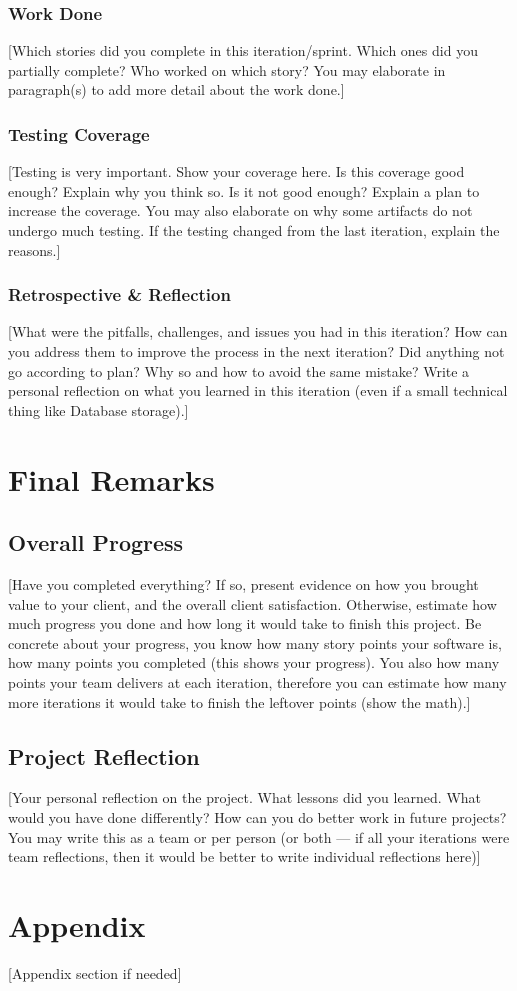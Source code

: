\documentclass{article}
\begin{document}
\subsubsection{Work Done}
[Which stories did you complete in this iteration/sprint. Which ones did you partially complete? Who worked on which story? You may elaborate in paragraph(s) to add more detail about the work done.]

\subsubsection{Testing Coverage}
[Testing is very important. Show your coverage here. Is this coverage good enough? Explain why you think so. Is it not good enough? Explain a plan to increase the coverage. You may also elaborate on why some artifacts do not undergo much testing. If the testing changed from the last iteration, explain the reasons.]

\subsubsection{Retrospective \& Reflection}
[What were the pitfalls, challenges, and issues you had in this iteration? How can you address them to improve the process in the next iteration? Did anything not go according to plan? Why so and how to avoid the same mistake? Write a personal reflection on what you learned in this iteration (even if a small technical thing like Database storage).]

\section{Final Remarks}

\subsection{Overall Progress}
[Have you completed everything? If so, present evidence on how you brought value to your client, and the overall client satisfaction. Otherwise, estimate how much progress you done and how long it would take to finish this project. Be concrete about your progress, you know how many story points your software is, how many points you completed (this shows your progress). You also how many points your team delivers at each iteration, therefore you can estimate how many more iterations it would take to finish the leftover points (show the math).]

\subsection{Project Reflection}
[Your personal reflection on the project. What lessons did you learned. What would you have done differently? How can you do better work in future projects? You may write this as a team or per person (or both --- if all your iterations were team reflections, then it would be better to write individual reflections here)]

\section*{Appendix}
[Appendix section if needed]
\end{document}
